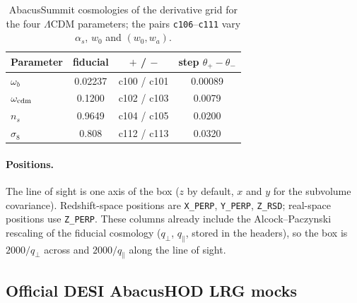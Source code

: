 \documentclass[11pt,twocolumn]{article}
\begin{document}
\begin{table}[!htbp]
\centering\small
\begin{tabular}{lccc}
\toprule
Parameter & fiducial & $+$ / $-$ & step $\theta_+-\theta_-$ \\
\midrule
$\omega_b$ & 0.02237 & c100 / c101 & 0.00089 \\
$\omega_{\rm cdm}$ & 0.1200 & c102 / c103 & 0.0079 \\
$n_s$ & 0.9649 & c104 / c105 & 0.0200 \\
$\sigma_8$ & 0.808 & c112 / c113 & 0.0320 \\
\bottomrule
\end{tabular}
\caption{AbacusSummit cosmologies of the derivative grid for the four $\Lambda$CDM parameters; the pairs \texttt{c106}--\texttt{c111} vary $\alpha_s$, $w_0$ and $(w_0, w_a)$.}
\label{tab:cosmo}
\end{table}

\paragraph{Positions.} The line of sight is one axis of the box ($z$ by default, $x$ and $y$ for the subvolume covariance). Redshift-space positions are \texttt{X\_PERP}, \texttt{Y\_PERP}, \texttt{Z\_RSD}; real-space positions use \texttt{Z\_PERP}. These columns already include the Alcock--Paczynski rescaling of the fiducial cosmology ($q_\perp$, $q_\parallel$, stored in the headers), so the box is $2000/q_\perp$ across and $2000/q_\parallel$ along the line of sight.

\subsection{Official DESI AbacusHOD LRG mocks}
\label{sec:official}
\end{document}
